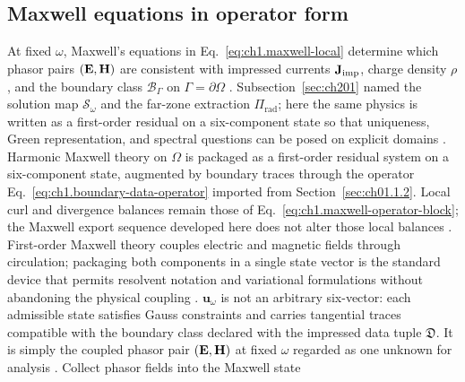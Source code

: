 \subsection{Maxwell equations in operator form} \label{sec:ch202}

At fixed $\omega$, Maxwell's equations in Eq.~\eqref{eq:ch1.maxwell-local} determine which phasor pairs $(\mathbf{E},\mathbf{H})$ are consistent with impressed currents $\mathbf{J}_{\mathrm{imp}}$, charge density $\rho$, and the boundary class $\mathcal{B}_\Gamma$ on $\Gamma=\partial\Omega$ \cite{maxwell1873,stratton1941}. Subsection~\ref{sec:ch201} named the solution map $\mathcal{S}_\omega$ and the far-zone extraction $\Pi_{\mathrm{rad}}$; here the same physics is written as a first-order residual on a six-component state so that uniqueness, Green representation, and spectral questions can be posed on explicit domains \cite{harrington2001}. Harmonic Maxwell theory on $\Omega$ is packaged
as a first-order residual system on a six-component state,
augmented by boundary traces through the operator
Eq.~\eqref{eq:ch1.boundary-data-operator} imported from
Section~\ref{sec:ch01.1.2}. Local curl and divergence balances remain those of
Eq.~\eqref{eq:ch1.maxwell-operator-block}; the Maxwell export sequence developed here does not
alter those local balances \cite{stratton1941}.
First-order Maxwell theory couples electric and magnetic fields through circulation;
packaging both components in a single state vector is the standard device that permits
resolvent notation and variational formulations without abandoning the physical coupling
\cite{stratton1941}. \(\mathbf{u}_\omega\) is
not an arbitrary six-vector: each admissible state satisfies Gauss constraints and carries
tangential traces compatible with the boundary class declared with the impressed data tuple
\(\mathfrak{D}\). It is simply the coupled phasor pair \((\mathbf{E},\mathbf{H})\) at fixed
\(\omega\) regarded as one unknown for analysis \cite{harrington2001}. Collect phasor fields into the Maxwell state

